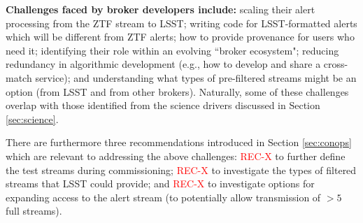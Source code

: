 {\bf Challenges faced by broker developers include:} scaling their alert processing from the  {ZTF} stream to  {LSST}; writing code for  {LSST}-formatted alerts which will be different from  {ZTF} alerts; how to provide  {provenance} for users who need it; identifying their role within an evolving ``broker ecosystem"; reducing redundancy in algorithmic development (e.g., how to develop and share a cross-match service); and understanding what types of pre-filtered streams might be an option (from  {LSST} and from other brokers).
Naturally, some of these challenges overlap with those identified from the science drivers discussed in Section \ref{sec:science}.




There are furthermore three recommendations introduced in Section \ref{sec:conops} which are relevant to addressing the above challenges: \textcolor{red}{REC-X} to further define the test streams during commissioning; \textcolor{red}{REC-X} to investigate the types of filtered streams that  {LSST} could provide; and \textcolor{red}{REC-X} to investigate options for expanding access to the alert stream (to potentially allow transmission of $>5$ full streams).



